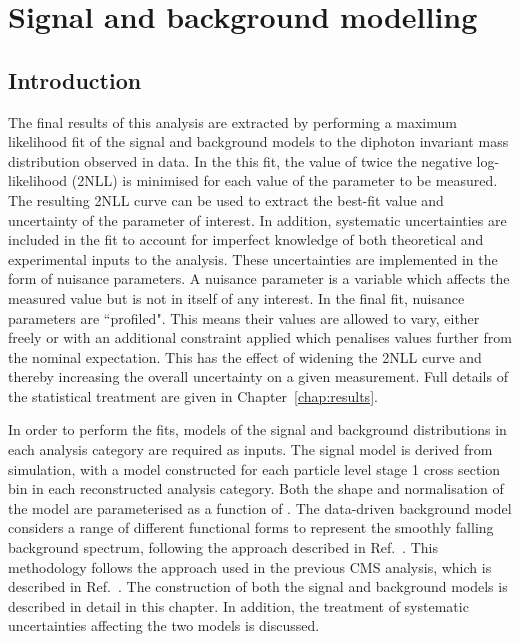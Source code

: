 \chapter{Signal and background modelling}
\label{chap:sigbkg}

\section{Introduction}

The final results of this analysis are extracted by performing a maximum likelihood fit 
of the signal and background models to the diphoton invariant mass distribution observed in data.
In the this fit, the value of twice the negative log-likelihood (2NLL) is minimised 
for each value of the parameter to be measured.
The resulting 2NLL curve can be used to extract the best-fit value and uncertainty 
of the parameter of interest.
In addition, systematic uncertainties are included in the fit to account for 
imperfect knowledge of both theoretical and experimental inputs to the analysis.
These uncertainties are implemented in the form of nuisance parameters.
A nuisance parameter is a variable which affects the measured value 
but is not in itself of any interest.
In the final fit, nuisance parameters are ``profiled".
This means their values are allowed to vary, 
either freely or with an additional constraint applied 
which penalises values further from the nominal expectation.
This has the effect of widening the 2NLL curve and thereby increasing the overall uncertainty
on a given measurement.
Full details of the statistical treatment are given in Chapter~\ref{chap:results}.

In order to perform the fits, models of the signal and background \mgg distributions 
in each analysis category are required as inputs.
The signal model is derived from simulation, 
with a model constructed for each particle level stage 1 cross section bin 
in each reconstructed analysis category.
Both the shape and normalisation of the model are parameterised as a function of \mH.
The data-driven background model considers a range of different functional forms to 
represent the smoothly falling background spectrum, 
following the approach described in Ref.~\cite{Envelope}.
This methodology follows the approach used in the previous CMS \Hgg analysis, 
which is described in Ref.~\cite{HIG-16-040}.
The construction of both the signal and background models is described in detail in this chapter.
In addition, the treatment of systematic uncertainties affecting the two models is discussed.

